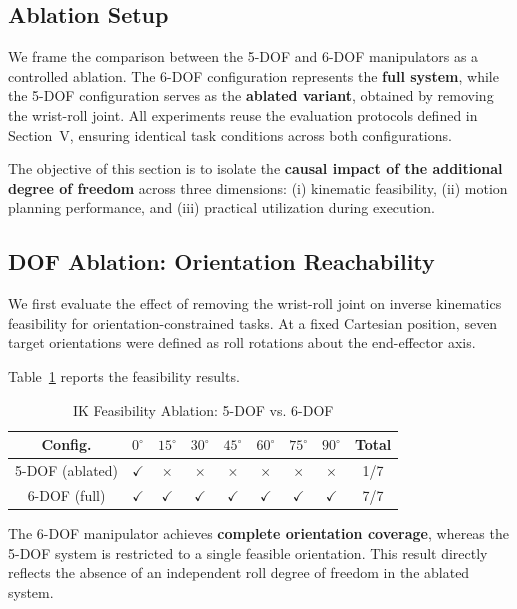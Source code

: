 \documentclass[conference]{IEEEtran}
\begin{document}
	\subsection{Ablation Setup}
	
	We frame the comparison between the 5-DOF and 6-DOF manipulators as a controlled ablation. The 6-DOF configuration represents the \textbf{full system}, while the 5-DOF configuration serves as the \textbf{ablated variant}, obtained by removing the wrist-roll joint. All experiments reuse the evaluation protocols defined in Section~V, ensuring identical task conditions across both configurations.
	
	The objective of this section is to isolate the \textbf{causal impact of the additional degree of freedom} across three dimensions: (i) kinematic feasibility, (ii) motion planning performance, and (iii) practical utilization during execution.
	
	\subsection{DOF Ablation: Orientation Reachability}
	
	We first evaluate the effect of removing the wrist-roll joint on inverse kinematics feasibility for orientation-constrained tasks. At a fixed Cartesian position, seven target orientations were defined as roll rotations about the end-effector axis.
	
	Table~\ref{tab:ik_ablation} reports the feasibility results.
	
	\begin{table}[t]
		\centering
		\caption{IK Feasibility Ablation: 5-DOF vs. 6-DOF}
		\label{tab:ik_ablation}
		\begin{tabular}{c|ccccccc|c}
			\hline
			\textbf{Config.} & $0^\circ$ & $15^\circ$ & $30^\circ$ & $45^\circ$ & $60^\circ$ & $75^\circ$ & $90^\circ$ & \textbf{Total} \\
			\hline
			5-DOF (ablated) & $\checkmark$ & $\times$ & $\times$ & $\times$ & $\times$ & $\times$ & $\times$ & 1/7 \\
			6-DOF (full)    & $\checkmark$ & $\checkmark$ & $\checkmark$ & $\checkmark$ & $\checkmark$ & $\checkmark$ & $\checkmark$ & 7/7 \\
			\hline
		\end{tabular}
	\end{table}
	
	The 6-DOF manipulator achieves \textbf{complete orientation coverage}, whereas the 5-DOF system is restricted to a single feasible orientation. This result directly reflects the absence of an independent roll degree of freedom in the ablated system.
	
\end{document}

